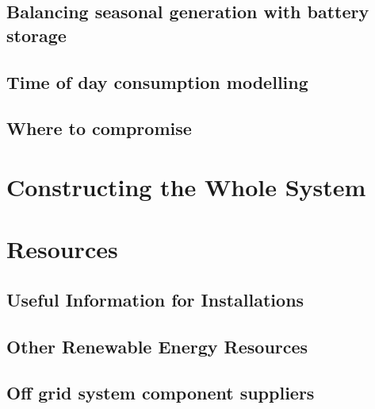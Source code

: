 \documentclass[letterpaper,10pt,english]{sphinxmanual}
\begin{document}
\section{Balancing seasonal generation with battery storage}
\label{\detokenize{additional_system_modelling:balancing-seasonal-generation-with-battery-storage}}

\section{Time of day consumption modelling}
\label{\detokenize{additional_system_modelling:time-of-day-consumption-modelling}}

\section{Where to compromise}
\label{\detokenize{additional_system_modelling:where-to-compromise}}

\chapter{Constructing the Whole System}
\label{\detokenize{constructing_the_whole_system:constructing-the-whole-system}}\label{\detokenize{constructing_the_whole_system::doc}}

\chapter{Resources}
\label{\detokenize{resources:resources}}\label{\detokenize{resources::doc}}

\section{Useful Information for Installations}
\label{\detokenize{resources:useful-information-for-installations}}

\section{Other Renewable Energy Resources}
\label{\detokenize{resources:other-renewable-energy-resources}}

\section{Off grid system component suppliers}
\label{\detokenize{resources:off-grid-system-component-suppliers}}
\end{document}
